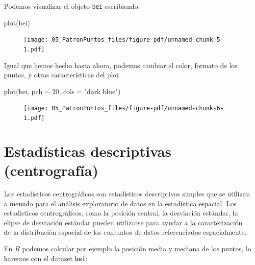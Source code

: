 \documentclass[
  letterpaper,
  DIV=11,
  numbers=noendperiod]{scrreprt}
\newenvironment{Shaded}{\begin{snugshade}}{\end{snugshade}}
\newcommand{\AttributeTok}[1]{\textcolor[rgb]{0.40,0.45,0.13}{#1}}
\newcommand{\DecValTok}[1]{\textcolor[rgb]{0.68,0.00,0.00}{#1}}
\newcommand{\FunctionTok}[1]{\textcolor[rgb]{0.28,0.35,0.67}{#1}}
\newcommand{\NormalTok}[1]{\textcolor[rgb]{0.00,0.23,0.31}{#1}}
\newcommand{\StringTok}[1]{\textcolor[rgb]{0.13,0.47,0.30}{#1}}
\begin{document}
Podemos visualizar el objeto \texttt{bei} escribiendo:

\begin{Shaded}
\begin{Highlighting}[]
\FunctionTok{plot}\NormalTok{(bei)}
\end{Highlighting}
\end{Shaded}

\begin{figure}[H]

{\centering \texttt{[image: 05\_PatronPuntos\_files/figure-pdf/unnamed-chunk-5-1.pdf]}

}

\end{figure}

Igual que hemos hecho hasta ahora, podemos cambiar el color, formato de
los puntos, y otras características del plot

\begin{Shaded}
\begin{Highlighting}[]
\FunctionTok{plot}\NormalTok{(bei, }\AttributeTok{pch =} \DecValTok{20}\NormalTok{, }\AttributeTok{cols =} \StringTok{"dark blue"}\NormalTok{)}
\end{Highlighting}
\end{Shaded}

\begin{figure}[H]

{\centering \texttt{[image: 05\_PatronPuntos\_files/figure-pdf/unnamed-chunk-6-1.pdf]}

}

\end{figure}

\hypertarget{estaduxedsticas-descriptivas-centrografuxeda}{%
\section{Estadísticas descriptivas
(centrografía)}\label{estaduxedsticas-descriptivas-centrografuxeda}}

Los estadísticos centrográficos son estadísticos descriptivos simples
que se utilizan a menudo para el análisis exploratorio de datos en la
estadística espacial. Los estadísticos centrográficos, como la posición
central, la desviación estándar, la elipse de desviación estándar pueden
utilizarse para ayudar a la caracterización de la distribución espacial
de los conjuntos de datos referenciados espacialmente.

En \(R\) podemos calcular por ejemplo la posición media y mediana de los
puntos, lo haremos con el dataset \texttt{bei}:
\end{document}
